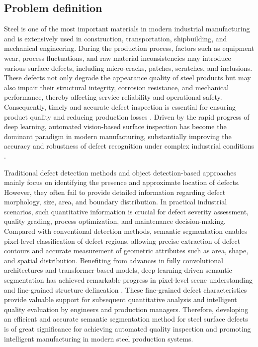 \documentclass[sn-basic]{sn-jnl}
\theoremstyle{thmstyleone}%
\theoremstyle{thmstyletwo}%
\theoremstyle{thmstylethree}%
\begin{document}
\subsection{Problem definition}
Steel is one of the most important materials in modern industrial manufacturing and is extensively used in construction, transportation, shipbuilding, and mechanical engineering. During the production process, factors such as equipment wear, process fluctuations, and raw material inconsistencies may introduce various surface defects, including micro-cracks, patches, scratches, and inclusions. These defects not only degrade the appearance quality of steel products but may also impair their structural integrity, corrosion resistance, and mechanical performance, thereby affecting service reliability and operational safety. Consequently, timely and accurate defect inspection is essential for ensuring product quality and reducing production losses \cite{Liu2025Global}. Driven by the rapid progress of deep learning, automated vision-based surface inspection has become the dominant paradigm in modern manufacturing, substantially improving the accuracy and robustness of defect recognition under complex industrial conditions \cite{Luo2024CDDNet,Liu2024Deep}.

Traditional defect detection methods and object detection-based approaches mainly focus on identifying the presence and approximate location of defects. However, they often fail to provide detailed information regarding defect morphology, size, area, and boundary distribution. In practical industrial scenarios, such quantitative information is crucial for defect severity assessment, quality grading, process optimization, and maintenance decision-making. Compared with conventional detection methods, semantic segmentation enables pixel-level classification of defect regions, allowing precise extraction of defect contours and accurate measurement of geometric attributes such as area, shape, and spatial distribution. Benefiting from advances in fully convolutional architectures and transformer-based models, deep learning-driven semantic segmentation has achieved remarkable progress in pixel-level scene understanding and fine-grained structure delineation \cite{Minaee2022Image,Xie2021SegFormer,Li2024Transformer}. These fine-grained defect characteristics provide valuable support for subsequent quantitative analysis and intelligent quality evaluation by engineers and production managers. Therefore, developing an efficient and accurate semantic segmentation method for steel surface defects is of great significance for achieving automated quality inspection and promoting intelligent manufacturing in modern steel production systems.
\end{document}
